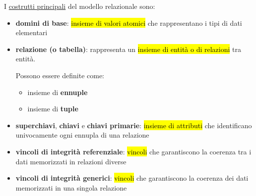 \documentclass[12pt, a4paper, oneside]{book}
\begin{document}
    I \underline{costrutti principali} del modello relazionale sono:
    \begin{itemize}[label=$\triangleright$]
      \item \textcolor{azzurrino}{\textbf{domini di base}}: \hl{insieme di valori atomici} che rappresentano i tipi di dati elementari
      \medskip
      \item \textcolor{azzurrino}{\textbf{relazione (o tabella)}}: rappresenta un \hl{insieme di entità o di relazioni} tra entità.
      
      Possono essere definite come:
      \begin{itemize}[label=$\star$]
        \item insieme di \textbf{ennuple}
        \item insieme di \textbf{tuple}
      \end{itemize}
      \medskip
      \item \textcolor{azzurrino}{\textbf{superchiavi}}, \textcolor{azzurrino}{\textbf{chiavi}} e \textcolor{azzurrino}{\textbf{chiavi primarie}}: \hl{insieme di attributi} che identificano univocamente ogni ennupla di una relazione
      \medskip
      \item \textcolor{azzurrino}{\textbf{vincoli di integrità referenziale}}: \hl{vincoli} che garantiscono la coerenza tra i dati memorizzati in relazioni diverse
      \medskip
      \item \textcolor{azzurrino}{\textbf{vincoli di integrità generici}}: \hl{vincoli} che garantiscono la coerenza dei dati memorizzati in una singola relazione
    \end{itemize}

\end{document}
